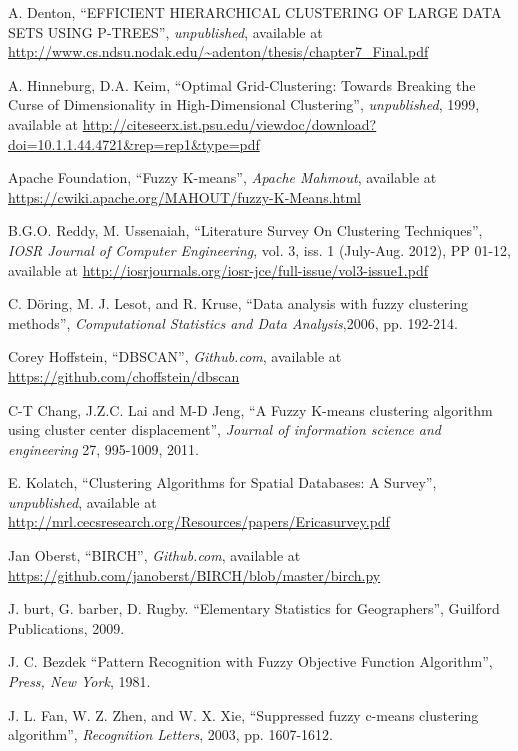 \documentclass[conference, 10pt]{IEEEtran}
\begin{document}
\newpage
\begin{thebibliography}{1}

 A. Denton, ``EFFICIENT HIERARCHICAL CLUSTERING OF LARGE DATA SETS USING P-TREES'', \emph{unpublished}, available at
\url{http://www.cs.ndsu.nodak.edu/~adenton/thesis/chapter7_Final.pdf}

 A. Hinneburg, D.A. Keim, ``Optimal Grid-Clustering: Towards Breaking the Curse of Dimensionality in High-Dimensional Clustering'', \emph{unpublished}, 1999, available at
\url{http://citeseerx.ist.psu.edu/viewdoc/download?doi=10.1.1.44.4721&rep=rep1&type=pdf} 

 Apache Foundation, ``Fuzzy K-means'', \emph{Apache Mahmout}, available at
\url{https://cwiki.apache.org/MAHOUT/fuzzy-K-Means.html}

 B.G.O. Reddy, M. Ussenaiah, ``Literature Survey On Clustering Techniques'', \emph{IOSR Journal of Computer Engineering}, vol. 3, iss. 1 (July-Aug. 2012), PP 01-12, available at
\url{http://iosrjournals.org/iosr-jce/full-issue/vol3-issue1.pdf}

 C. Döring, M. J. Lesot, and R. Kruse, ``Data analysis with fuzzy clustering methods'', \emph{Computational Statistics and Data Analysis},2006, pp. 192-214.

 Corey Hoffstein, ``DBSCAN'', \emph{Github.com}, available at
\url{https://github.com/choffstein/dbscan}

 C-T Chang, J.Z.C. Lai and M-D Jeng, ``A Fuzzy K-means clustering algorithm  using cluster center displacement'', \emph{Journal of information science and engineering} 27, 995-1009, 2011.

 E. Kolatch, ``Clustering Algorithms for Spatial Databases: A Survey'', \emph{unpublished}, available at
\url{http://mrl.cecsresearch.org/Resources/papers/Ericasurvey.pdf}

 Jan Oberst, ``BIRCH'', \emph{Github.com}, available at
\url{https://github.com/janoberst/BIRCH/blob/master/birch.py}

 J. burt, G. barber, D. Rugby.  ``Elementary Statistics for Geographers'', Guilford Publications, 2009.

 J. C. Bezdek ``Pattern Recognition with Fuzzy Objective Function Algorithm'', \emph{Press, New York}, 1981.

 J. L. Fan, W. Z. Zhen, and W. X. Xie, ``Suppressed fuzzy c-means clustering algorithm'', \emph{ Recognition Letters}, 2003, pp. 1607-1612.


\end{thebibliography}
\end{document}
